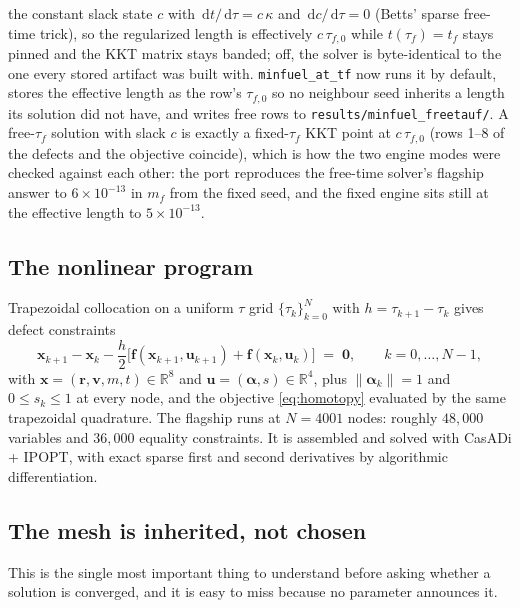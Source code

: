 \documentclass[11pt]{article}
\newcommand{\ud}{\,\mathrm{d}}
\newcommand{\vect}[1]{\bm{#1}}
\begin{document}
the constant slack state $c$ with $\ud t/\ud\tau = c\,\kappa$ and
$\ud c/\ud\tau = 0$ (Betts' sparse free-time trick), so the regularized
length is effectively $c\,\tau_{f,0}$ while $t(\tau_f)=t_f$ stays pinned
and the KKT matrix stays banded; off, the solver is byte-identical to the one
every stored artifact was built with. \texttt{minfuel\_at\_tf} now runs it
by default, stores the effective length as the row's $\tau_{f,0}$ so no
neighbour seed inherits a length its solution did not have, and writes free
rows to \texttt{results/minfuel\_freetauf/}. A free-$\tau_f$ solution with
slack $c$ is exactly a fixed-$\tau_f$ KKT point at $c\,\tau_{f,0}$ (rows
1--8 of the defects and the objective coincide), which is how the two engine
modes were checked against each other: the port reproduces the free-time
solver's flagship answer to $6\times10^{-13}$ in $m_f$ from the fixed seed,
and the fixed engine sits still at the effective length to $5\times10^{-13}$.

\subsection{The nonlinear program}

Trapezoidal collocation on a uniform $\tau$ grid $\{\tau_k\}_{k=0}^{N}$ with
$h=\tau_{k+1}-\tau_k$ gives defect constraints
\begin{equation}
\vect{x}_{k+1}-\vect{x}_k-\frac{h}{2}\Big[\vect{f}(\vect{x}_{k+1},\vect{u}_{k+1})
+\vect{f}(\vect{x}_k,\vect{u}_k)\Big] \;=\; \vect{0},
\qquad k=0,\dots,N-1,
\end{equation}
with $\vect{x}=(\vect{r},\vect{v},m,t)\in\mathbb{R}^8$ and
$\vect{u}=(\vect{\alpha},s)\in\mathbb{R}^4$, plus $\|\vect{\alpha}_k\|=1$ and
$0\le s_k\le 1$ at every node, and the objective \eqref{eq:homotopy} evaluated
by the same trapezoidal quadrature. The flagship runs at $N=4001$ nodes:
roughly $48{,}000$ variables and $36{,}000$ equality constraints. It is
assembled and solved with CasADi + IPOPT, with exact sparse first and second
derivatives by algorithmic differentiation.

\subsection{The mesh is inherited, not chosen}
\label{sec:mesh}

This is the single most important thing to understand before asking whether a
solution is converged, and it is easy to miss because no parameter announces it.
\end{document}
